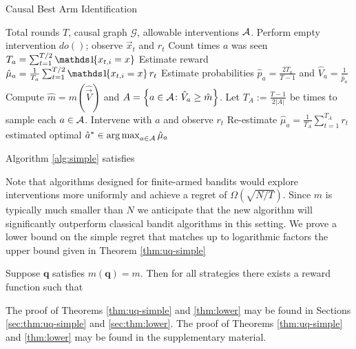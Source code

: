 \begin{algorithm}[h]
\caption{Causal Best Arm Identification}\label{alg:simple}
\begin{algorithmic}[1]
 Total rounds $T$, causal graph $\mathcal{G}$, allowable interventions $\mathcal{A}$. 
\STATE Perform empty intervention $do()$; observe $\vec{x}_t$ and $r_t$
\ENDFOR
{}
\STATE Count times $a$ was seen $T_a = \sum_{t=1}^{T/2} \ind{x_{t,i} = x}$
\STATE Estimate reward $\hat{\mu}_a = \frac{1}{T_a} \sum_{t=1}^{T/2} \ind{x_{t,i} = x} r_t$
\STATE Estimate probabilities $\hat{p}_a = \frac{2 T_a}{T-1}$ and $\hat{V}_a = \frac{1}{\hat{p}_a}$
\ENDFOR
\STATE Compute $\hat{m} = m(\hat{\vec{V}})$ and $A = \left\{a \in \mathcal{A} \colon \hat{V}_a \geq \hat{m}\right\}$.
\STATE Let $T_A := \frac{T-1}{2 |A|}$ be times to sample each $a\in\mathcal{A}$.
\STATE Intervene with $a$ and observe $r_t$
\ENDFOR
\STATE Re-estimate $\hat{\mu}_a = \frac{1}{T_A} \sum_{t=1}^{T_A} r_t$
\ENDFOR
\RETURN estimated optimal $\hat{a}^* \in \argmax_{a\in\actions} \hat{\mu}_a$
\end{algorithmic}
\end{algorithm}

\begin{theorem}\label{thm:uq-simple}
Algorithm \ref{alg:simple} satisfies
\end{theorem}

Note that algorithms designed for finite-armed bandits would explore interventions more uniformly and achieve a regret of $\Omega(\sqrt{N/T})$.
Since $m$ is typically much smaller than $N$ we anticipate that the new algorithm will significantly outperform classical bandit algorithms in
this setting.
We prove a lower bound on the simple regret that matches up to logarithmic factors the upper bound given in Theorem \ref{thm:uq-simple}

\begin{theorem}\label{thm:lower}
Suppose $\boldsymbol{q}$ satisfies $m(\boldsymbol{q}) = m$.
Then for all strategies there exists a reward function such that
\end{theorem}

\ifsup
The proof of Theorems \ref{thm:uq-simple} and \ref{thm:lower} may be found in Sections \ref{sec:thm:uq-simple} and \ref{sec:thm:lower}.
\else
The proof of Theorems \ref{thm:uq-simple} and \ref{thm:lower} may be found in the supplementary material.
\fi



